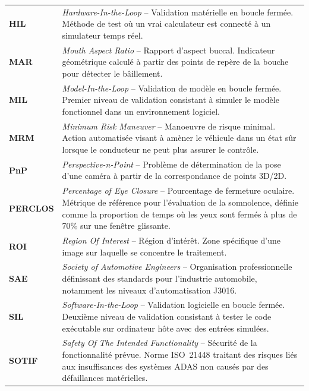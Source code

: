 \documentclass[12pt,a4paper]{report}
\begin{document}
\begin{longtable}{L{3.5cm} L{11cm}}
\textbf{HIL}    & \textit{Hardware-In-the-Loop} -- Validation mat\'erielle en boucle ferm\'ee. M\'ethode de test o\`u un vrai calculateur est connect\'e \`a un simulateur temps r\'eel. \\[0.2cm]

\textbf{MAR}    & \textit{Mouth Aspect Ratio} -- Rapport d'aspect buccal. Indicateur g\'eom\'etrique calcul\'e \`a partir des points de rep\`ere de la bouche pour d\'etecter le b\^aillement. \\[0.2cm]

\textbf{MIL}    & \textit{Model-In-the-Loop} -- Validation de mod\`ele en boucle ferm\'ee. Premier niveau de validation consistant \`a simuler le mod\`ele fonctionnel dans un environnement logiciel. \\[0.2cm]

\textbf{MRM}    & \textit{Minimum Risk Maneuver} -- Manoeuvre de risque minimal. Action automatis\'ee visant \`a am\`ener le v\'ehicule dans un \'etat s\^ur lorsque le conducteur ne peut plus assurer le contr\^ole. \\[0.2cm]

\textbf{PnP}    & \textit{Perspective-n-Point} -- Probl\`eme de d\'etermination de la pose d'une cam\'era \`a partir de la correspondance de points 3D/2D. \\[0.2cm]

\textbf{PERCLOS}& \textit{Percentage of Eye Closure} -- Pourcentage de fermeture oculaire. M\'etrique de r\'ef\'erence pour l'\'evaluation de la somnolence, d\'efinie comme la proportion de temps o\`u les yeux sont ferm\'es \`a plus de 70\% sur une fen\^etre glissante. \\[0.2cm]

\textbf{ROI}    & \textit{Region Of Interest} -- R\'egion d'int\'er\^et. Zone sp\'ecifique d'une image sur laquelle se concentre le traitement. \\[0.2cm]

\textbf{SAE}    & \textit{Society of Automotive Engineers} -- Organisation professionnelle d\'efinissant des standards pour l'industrie automobile, notamment les niveaux d'automatisation J3016. \\[0.2cm]

\textbf{SIL}    & \textit{Software-In-the-Loop} -- Validation logicielle en boucle ferm\'ee. Deuxi\`eme niveau de validation consistant \`a tester le code ex\'ecutable sur ordinateur h\^ote avec des entr\'ees simul\'ees. \\[0.2cm]

\textbf{SOTIF}  & \textit{Safety Of The Intended Functionality} -- S\'ecurit\'e de la fonctionnalit\'e pr\'evue. Norme ISO~21448 traitant des risques li\'es aux insuffisances des syst\`emes ADAS non caus\'es par des d\'efaillances mat\'erielles. \\[0.2cm]

\end{longtable}
\end{document}
